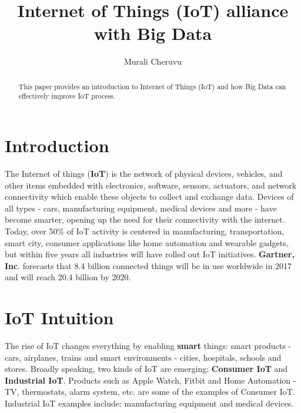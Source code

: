 \documentclass[sigconf]{acmart}
\begin{document}
\title{Internet of Things (IoT) alliance with Big Data}


\author{Murali Cheruvu}

\renewcommand{\shortauthors}{M. Cheruvu}


\begin{abstract}
This paper provides an introduction to Internet of Things (IoT) and how Big Data can effectively improve IoT process.
\end{abstract}



\maketitle

\section{Introduction}

The Internet of things (\textbf{IoT}) is the network of physical devices, vehicles, and other items embedded with electronics, software, sensors, actuators, and network connectivity which enable these objects to collect and exchange data\cite{wiki_iot}. Devices of all types - cars, manufacturing equipment, medical devices and more - have become smarter, opening up the need for their connectivity with the internet. Today, over 50\% of IoT activity is centered in manufacturing, transportation, smart city, consumer applications like home automation and wearable gadgets, but within five years all industries will have rolled out IoT initiatives. \textbf{Gartner, Inc}. forecasts that 8.4 billion connected things will be in use worldwide in 2017 and will reach 20.4 billion by 2020\cite{Gartner}. 

\section{IoT Intuition}

The rise of IoT changes everything by enabling \textbf{smart} things: smart products - cars, airplanes, trains and smart environments - cities, hospitals, schools and stores. Broadly speaking, two kinds of IoT are emerging: \textbf{Consumer IoT} and \textbf{Industrial IoT}. Products such as Apple Watch, Fitbit and Home Automation - TV, thermostats, alarm system, etc. are some of the examples of Consumer IoT. Industrial IoT examples include: manufacturing equipment and medical devices.
\end{document}
